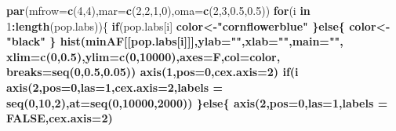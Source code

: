 \documentclass[11pt,]{article}
\newenvironment{Shaded}{\begin{snugshade}}{\end{snugshade}}
\newcommand{\KeywordTok}[1]{\textcolor[rgb]{0.13,0.29,0.53}{\textbf{#1}}}
\newcommand{\DataTypeTok}[1]{\textcolor[rgb]{0.13,0.29,0.53}{#1}}
\newcommand{\DecValTok}[1]{\textcolor[rgb]{0.00,0.00,0.81}{#1}}
\newcommand{\FloatTok}[1]{\textcolor[rgb]{0.00,0.00,0.81}{#1}}
\newcommand{\StringTok}[1]{\textcolor[rgb]{0.31,0.60,0.02}{#1}}
\newcommand{\OtherTok}[1]{\textcolor[rgb]{0.56,0.35,0.01}{#1}}
\newcommand{\ControlFlowTok}[1]{\textcolor[rgb]{0.13,0.29,0.53}{\textbf{#1}}}
\newcommand{\OperatorTok}[1]{\textcolor[rgb]{0.81,0.36,0.00}{\textbf{#1}}}
\newcommand{\NormalTok}[1]{#1}
\begin{document}
\begin{Shaded}
\begin{Highlighting}[]
\KeywordTok{par}\NormalTok{(}\DataTypeTok{mfrow=}\KeywordTok{c}\NormalTok{(}\DecValTok{4}\NormalTok{,}\DecValTok{4}\NormalTok{),}\DataTypeTok{mar=}\KeywordTok{c}\NormalTok{(}\DecValTok{2}\NormalTok{,}\DecValTok{2}\NormalTok{,}\DecValTok{1}\NormalTok{,}\DecValTok{0}\NormalTok{),}\DataTypeTok{oma=}\KeywordTok{c}\NormalTok{(}\DecValTok{2}\NormalTok{,}\DecValTok{3}\NormalTok{,}\FloatTok{0.5}\NormalTok{,}\FloatTok{0.5}\NormalTok{))}
\ControlFlowTok{for}\NormalTok{(i }\ControlFlowTok{in} \DecValTok{1}\OperatorTok{:}\KeywordTok{length}\NormalTok{(pop.labs))\{}
  \ControlFlowTok{if}\NormalTok{(pop.labs[i] }\OperatorTok{%in%}\StringTok{ }\KeywordTok{names}\NormalTok{(fw.afs))\{}
\NormalTok{    color<-}\StringTok{"cornflowerblue"}
\NormalTok{  \}}\ControlFlowTok{else}\NormalTok{\{}
\NormalTok{    color<-}\StringTok{"black"}
\NormalTok{  \}}
  \KeywordTok{hist}\NormalTok{(minAF[[pop.labs[i]]],}\DataTypeTok{ylab=}\StringTok{""}\NormalTok{,}\DataTypeTok{xlab=}\StringTok{""}\NormalTok{,}\DataTypeTok{main=}\StringTok{""}\NormalTok{,}
       \DataTypeTok{xlim=}\KeywordTok{c}\NormalTok{(}\DecValTok{0}\NormalTok{,}\FloatTok{0.5}\NormalTok{),}\DataTypeTok{ylim=}\KeywordTok{c}\NormalTok{(}\DecValTok{0}\NormalTok{,}\DecValTok{10000}\NormalTok{),}\DataTypeTok{axes=}\NormalTok{F,}\DataTypeTok{col=}\NormalTok{color,}
       \DataTypeTok{breaks=}\KeywordTok{seq}\NormalTok{(}\DecValTok{0}\NormalTok{,}\FloatTok{0.5}\NormalTok{,}\FloatTok{0.05}\NormalTok{))}
  \KeywordTok{axis}\NormalTok{(}\DecValTok{1}\NormalTok{,}\DataTypeTok{pos=}\DecValTok{0}\NormalTok{,}\DataTypeTok{cex.axis=}\DecValTok{2}\NormalTok{)}
  \ControlFlowTok{if}\NormalTok{(i }\OperatorTok{%in%}\StringTok{ }\KeywordTok{c}\NormalTok{(}\DecValTok{1}\NormalTok{,}\DecValTok{5}\NormalTok{,}\DecValTok{9}\NormalTok{,}\DecValTok{13}\NormalTok{))\{}
    \KeywordTok{axis}\NormalTok{(}\DecValTok{2}\NormalTok{,}\DataTypeTok{pos=}\DecValTok{0}\NormalTok{,}\DataTypeTok{las=}\DecValTok{1}\NormalTok{,}\DataTypeTok{cex.axis=}\DecValTok{2}\NormalTok{,}\DataTypeTok{labels =} \KeywordTok{seq}\NormalTok{(}\DecValTok{0}\NormalTok{,}\DecValTok{10}\NormalTok{,}\DecValTok{2}\NormalTok{),}\DataTypeTok{at=}\KeywordTok{seq}\NormalTok{(}\DecValTok{0}\NormalTok{,}\DecValTok{10000}\NormalTok{,}\DecValTok{2000}\NormalTok{))}
\NormalTok{  \}}\ControlFlowTok{else}\NormalTok{\{}
    \KeywordTok{axis}\NormalTok{(}\DecValTok{2}\NormalTok{,}\DataTypeTok{pos=}\DecValTok{0}\NormalTok{,}\DataTypeTok{las=}\DecValTok{1}\NormalTok{,}\DataTypeTok{labels =} \OtherTok{FALSE}\NormalTok{,}\DataTypeTok{cex.axis=}\DecValTok{2}\NormalTok{)}
}}
\end{Highlighting}
\end{Shaded}
\end{document}
